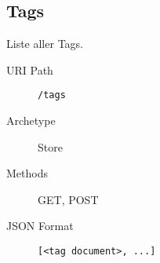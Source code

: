 \documentclass[10pt,a4paper]{scrartcl}
\begin{document}
\subsection{Tags}

Liste aller Tags.

\begin{description}
	\item[URI Path] \texttt{/tags}
	\item[Archetype] Store
	\item[Methods] GET, POST
	\item[JSON Format] \hfill
\begin{lstlisting}
[<tag document>, ...]
\end{lstlisting}
\end{description}




\end{document}
